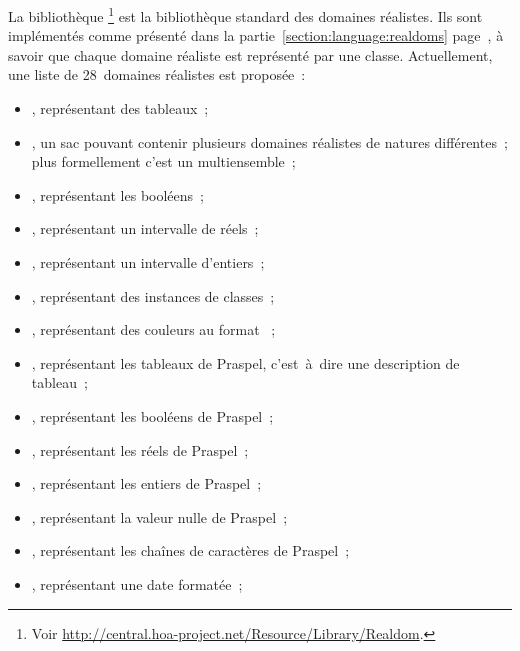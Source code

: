 La bibliothèque \footnote{Voir
\url{http://central.hoa-project.net/Resource/Library/Realdom}.} est la
bibliothèque standard des domaines réalistes. Ils sont implémentés comme
présenté dans la partie~\ref{section:language:realdoms}
page~\pageref{section:language:realdoms}, à savoir que chaque domaine réaliste
est représenté par une classe.  Actuellement, une liste de 28~domaines réalistes
est proposée~:
%
\begin{itemize}

\item {}, représentant des tableaux~;

\item {}, un sac pouvant contenir plusieurs domaines réalistes de
natures différentes~; plus formellement c'est un multiensemble~;

\item {}, représentant les booléens~;

\item {}, représentant un intervalle de réels~;

\item {}, représentant un intervalle d'entiers~;

\item {}, représentant des instances de classes~;

\item {}, représentant des couleurs au format ~;

\item {}, représentant les tableaux de Praspel, c'est~à~dire une
description de tableau~;

\item {}, représentant les booléens de Praspel~;

\item {}, représentant les réels de Praspel~;

\item {}, représentant les entiers de Praspel~;

\item {}, représentant la valeur nulle de Praspel~;

\item {}, représentant les chaînes de caractères de Praspel~;

\item {}, représentant une date formatée~;


\end{itemize}
